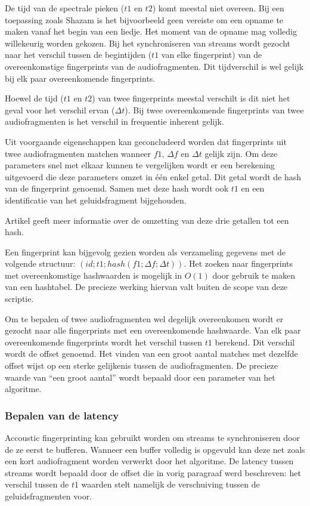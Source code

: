 De tijd van de spectrale pieken ($t1$ en $t2$) komt meestal niet overeen. Bij een toepassing zoals Shazam is het bijvoorbeeld geen vereiste om een opname te maken vanaf het begin van een liedje. Het moment van de opname mag volledig willekeurig worden gekozen. Bij het synchroniseren van streams wordt gezocht naar het verschil tussen de begintijden ($t1$ van elke fingerprint) van de overeenkomstige fingerprints van de audiofragmenten. Dit tijdverschil is wel gelijk bij elk paar overeenkomende fingerprints.

Hoewel de tijd ($t1$ en $t2$) van twee fingerprints meestal verschilt is dit niet het geval voor het verschil ervan ($\Delta t$). Bij twee overeenkomende fingerprints van twee audiofragmenten is het verschil in frequentie inherent gelijk.

Uit voorgaande eigenschappen kan geconcludeerd worden dat fingerprints uit twee audiofragmenten matchen wanneer $ f1 $, $ \Delta f $ en $ \Delta t $ gelijk zijn. Om deze parameters snel met elkaar kunnen te vergelijken wordt er een berekening uitgevoerd die deze parameters omzet in één enkel getal. Dit getal wordt de hash van de fingerprint genoemd. Samen met deze hash wordt ook $ t1 $ en een identificatie van het geluidsfragment bijgehouden.

Artikel \cite{six2014panako} geeft meer informatie over de omzetting van deze drie getallen tot een hash.

Een fingerprint kan bijgevolg gezien worden als verzameling gegevens met de volgende structuur: $ ( id; t1; hash(f1; \Delta f; \Delta t) ) $. Het zoeken naar fingerprints met overeenkomstige hashwaarden is mogelijk in $O(1)$ door gebruik te maken van een hashtabel. De precieze werking hiervan valt buiten de scope van deze scriptie.

Om te bepalen of twee audiofragmenten wel degelijk overeenkomen wordt er gezocht naar alle fingerprints met een overeenkomende hashwaarde. Van elk paar overeenkomende fingerprints wordt het verschil tussen $ t1 $ berekend. Dit verschil wordt de offset genoemd. Het vinden van een groot aantal matches met dezelfde offset wijst op een sterke gelijkenis tussen de audiofragmenten. De precieze waarde van ``een groot aantal'' wordt bepaald door een parameter van het algoritme.

\subsubsection{Bepalen van de latency}

Accoustic fingerprinting kan gebruikt worden om streams te synchroniseren door de ze eerst te bufferen. Wanneer een buffer volledig is opgevuld kan deze net zoals een kort audiofragment worden verwerkt door het algoritme. De latency tussen streams wordt bepaald door de offset die in vorig paragraaf werd beschreven: het verschil tussen de $ t1 $ waarden stelt namelijk de verschuiving tussen de geluidsfragmenten voor.

